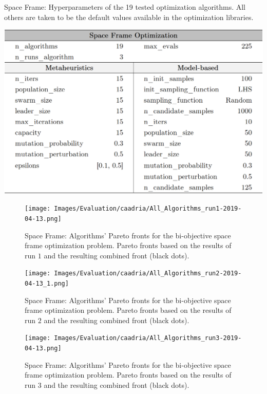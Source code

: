 \begin{table}[h!]
	\centering
	\label{table:configurationsspaceframe}
	\caption[Space Frame: Hyperparameters of the tested optimization optimization algorithms]{Space Frame: Hyperparameters of the 19 tested optimization algorithms. All others are taken to be the default values available in the optimization libraries.}
	\includegraphics[width=\textwidth]{tables_and_code/appendices/configs_space_frame.PNG}
\end{table}

\begin{figure}[h!]
	\centering
	\texttt{[image: Images/Evaluation/caadria/All\_Algorithms\_run1-2019-04-13.png]}
	\caption[Space Frame: Pareto Fronts for run 1]{Space Frame: Algorithms' Pareto fronts for the bi-objective space frame optimization problem. Pareto fronts based on the results of run $1$ and the resulting combined front (black dots).}
	\label{table:spaceframerun1}
\end{figure}

\begin{figure}[h!]
	\centering
	\texttt{[image: Images/Evaluation/caadria/All\_Algorithms\_run2-2019-04-13\_1.png]}
	\caption[Space Frame: Pareto Fronts for run 2]{Space Frame: Algorithms' Pareto fronts for the bi-objective space frame optimization problem. Pareto fronts based on the results of run $2$ and the resulting combined front (black dots).}
	\label{table:spaceframesrun2}
\end{figure}

\begin{figure}[h!]
	\centering
	\texttt{[image: Images/Evaluation/caadria/All\_Algorithms\_run3-2019-04-13.png]}
	\caption[Space Frame: Pareto Fronts for run 3]{Space Frame: Algorithms' Pareto fronts for the bi-objective space frame optimization problem. Pareto fronts based on the results of run $3$ and the resulting combined front (black dots).}
	\label{table:spaceframerun3}
\end{figure}

